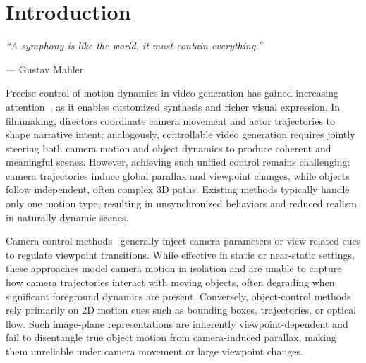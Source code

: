 \section{Introduction}
\label{sec:intro}

{\noindent\itshape
“A symphony is like the world, it must contain everything.”%
\vspace{-0.5em}
\begin{flushright}
\normalfont--- Gustav Mahler
\end{flushright}
}
\vspace{-0.5em}

\noindent Precise control of motion dynamics in video generation has gained increasing attention~\cite{zhang2025proteus, hu2024motionmaster, chu2025wan, ling2024motionclone, huang2026live}, as it enables customized synthesis and richer visual expression. In filmmaking, directors coordinate camera movement and actor trajectories to shape narrative intent; analogously, controllable video generation requires jointly steering both camera motion and object dynamics to produce coherent and meaningful scenes. However, achieving such unified control remains challenging: camera trajectories induce global parallax and viewpoint changes, while objects follow independent, often complex 3D paths. Existing methods typically handle only one motion type, resulting in unsynchronized behaviors and reduced realism in naturally dynamic scenes.


Camera-control methods~\cite{he2024cameractrl,feng2024i2vcontrol,xu2024camco,hou2024training,bahmani2025ac3d,bahmani2024vd3d} generally inject camera parameters or view-related cues to regulate viewpoint transitions. While effective in static or near-static settings, these approaches model camera motion in isolation and are unable to capture how camera trajectories interact with moving objects, often degrading when significant foreground dynamics are present. Conversely, object-control methods~\cite{shi2024motion,yin2023dragnuwa,zhang2025tora,zhou2025trackgo,jain2024peekaboo,li2025magicmotion,fu20243dtrajmaster} rely primarily on 2D motion cues such as bounding boxes, trajectories, or optical flow. Such image-plane representations are inherently viewpoint-dependent and fail to disentangle true object motion from camera-induced parallax, making them unreliable under camera movement or large viewpoint changes.


